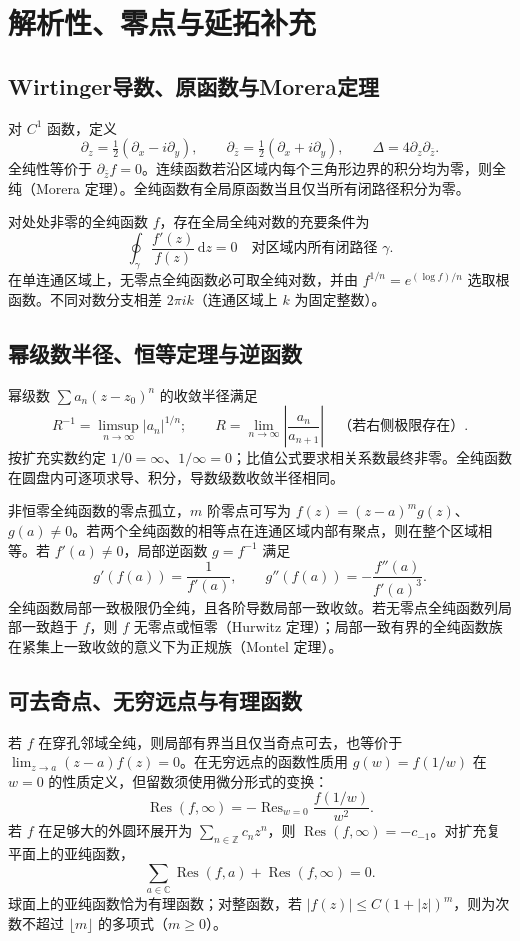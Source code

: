 \documentclass[../main.tex]{subfiles}
\begin{document}
\section{解析性、零点与延拓补充}
\subsection{Wirtinger导数、原函数与Morera定理}
对 $C^1$ 函数，定义
\[
\partial_z=\tfrac12(\partial_x-i\partial_y),\qquad
\partial_{\bar z}=\tfrac12(\partial_x+i\partial_y),\qquad
\Delta=4\partial_z\partial_{\bar z}.
\]
全纯性等价于 $\partial_{\bar z}f=0$。连续函数若沿区域内每个三角形边界的积分均为零，则全纯（Morera 定理）。全纯函数有全局原函数当且仅当所有闭路径积分为零。

对处处非零的全纯函数 $f$，存在全局全纯对数的充要条件为
\[
\oint_\gamma\frac{f'(z)}{f(z)}\,\mathrm dz=0
\quad\text{对区域内所有闭路径 }\gamma.
\]
在单连通区域上，无零点全纯函数必可取全纯对数，并由 $f^{1/n}=e^{(\log f)/n}$ 选取根函数。不同对数分支相差 $2\pi i k$（连通区域上 $k$ 为固定整数）。

\subsection{幂级数半径、恒等定理与逆函数}
幂级数 $\sum a_n(z-z_0)^n$ 的收敛半径满足
\[
R^{-1}=\limsup_{n\to\infty}|a_n|^{1/n};\qquad
R=\lim_{n\to\infty}\left|\frac{a_n}{a_{n+1}}\right|
\quad\text{（若右侧极限存在）}.
\]
按扩充实数约定 $1/0=\infty$、$1/\infty=0$；比值公式要求相关系数最终非零。全纯函数在圆盘内可逐项求导、积分，导数级数收敛半径相同。

非恒零全纯函数的零点孤立，$m$ 阶零点可写为 $f(z)=(z-a)^mg(z)$、$g(a)\ne0$。若两个全纯函数的相等点在连通区域内部有聚点，则在整个区域相等。若 $f'(a)\ne0$，局部逆函数 $g=f^{-1}$ 满足
\[
g'(f(a))=\frac1{f'(a)},\qquad
g''(f(a))=-\frac{f''(a)}{f'(a)^3}.
\]
全纯函数局部一致极限仍全纯，且各阶导数局部一致收敛。若无零点全纯函数列局部一致趋于 $f$，则 $f$ 无零点或恒零（Hurwitz 定理）；局部一致有界的全纯函数族在紧集上一致收敛的意义下为正规族（Montel 定理）。

\subsection{可去奇点、无穷远点与有理函数}
若 $f$ 在穿孔邻域全纯，则局部有界当且仅当奇点可去，也等价于 $\lim_{z\to a}(z-a)f(z)=0$。在无穷远点的函数性质用 $g(w)=f(1/w)$ 在 $w=0$ 的性质定义，但留数须使用微分形式的变换：
\[
\operatorname{Res}(f,\infty)=-\operatorname{Res}_{w=0}\frac{f(1/w)}{w^2}.
\]
若 $f$ 在足够大的外圆环展开为 $\sum_{n\in\mathbb Z}c_nz^n$，则 $\operatorname{Res}(f,\infty)=-c_{-1}$。对扩充复平面上的亚纯函数，
\[
\sum_{a\in\mathbb C}\operatorname{Res}(f,a)+\operatorname{Res}(f,\infty)=0.
\]
球面上的亚纯函数恰为有理函数；对整函数，若 $|f(z)|\le C(1+|z|)^m$，则为次数不超过 $\lfloor m\rfloor$ 的多项式（$m\ge0$）。
\end{document}

